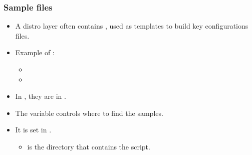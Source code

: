 \begin{frame}
  \frametitle{Sample files}
  \begin{itemize}
    \item A distro layer often contains , used as
      templates to build key configurations files.
    \item Example of :
      \begin{itemize}
        \item {}
        \item {}
      \end{itemize}
    \item In , they are in .
    \item The  variable controls where to find the
      samples.
    \item It is set in .
      \begin{itemize}
        \item {} is the directory that contains the
           script.
      \end{itemize}
  \end{itemize}
\end{frame}
